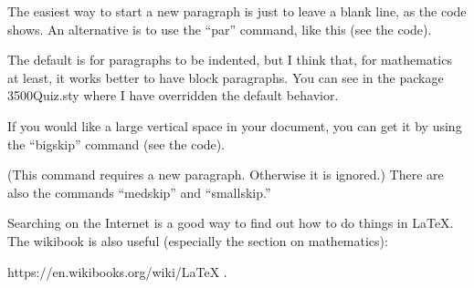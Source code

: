\documentclass{article}
\begin{document}
The easiest way to start a new paragraph is just to leave a blank line, as the code shows.  An alternative is to use the ``par''
command, like this (see the code). \par The default is for paragraphs to be indented, but I think that, for mathematics at least, it works
better to have block paragraphs.  You can see in the package 3500Quiz.sty where I have overridden the default behavior.

If you would like a large vertical space in your document, you can get it by using the ``bigskip'' command (see the code).

\bigskip
(This command requires a new paragraph. Otherwise it is ignored.)  There are also the commands ``medskip'' and ``smallskip.''

Searching on the Internet is a good way to find out how to do things in \LaTeX.  The wikibook is also useful (especially the
section on mathematics):

https://en.wikibooks.org/wiki/LaTeX .
\end{document}
